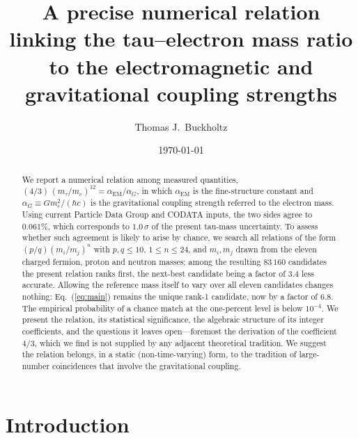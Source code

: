 \documentclass[aps,prd,twocolumn,amsmath,amssymb,floatfix,nofootinbib]{revtex4-2}
\begin{document}
\title{A precise numerical relation linking the tau--electron mass ratio
to the electromagnetic and gravitational coupling strengths}

\author{Thomas J.\ Buckholtz}

\date{\today}

\begin{abstract}
We report a numerical relation among measured quantities,
$(4/3)\,(m_\tau/m_e)^{12} = \alpha_{\mathrm{EM}}/\alpha_G$,
in which $\alpha_{\mathrm{EM}}$ is the fine-structure constant and
$\alpha_G \equiv G m_e^2/(\hbar c)$ is the gravitational coupling strength
referred to the electron mass. Using current Particle Data Group and CODATA
inputs, the two sides agree to $0.061\%$, which corresponds to
$1.0\,\sigma$ of the present tau-mass uncertainty. To assess whether such
agreement is likely to arise by chance, we search all relations of the form
$(p/q)(m_i/m_j)^n$ with $p,q\le 10$, $1\le n\le 24$, and $m_i,m_j$ drawn from
the eleven charged fermion, proton and neutron masses; among the resulting
$83\,160$ candidates the present relation ranks first, the next-best candidate
being a factor of $3.4$ less accurate. Allowing the reference mass itself to
vary over all eleven candidates changes nothing: Eq.~(\ref{eq:main}) remains
the unique rank-1 candidate, now by a factor of $6.8$. The empirical
probability of a chance match at the one-percent level is below $10^{-4}$. We
present the relation, its statistical significance, the algebraic structure of
its integer coefficients, and the questions it leaves open---foremost the
derivation of the coefficient $4/3$, which we find is not supplied by any
adjacent theoretical tradition. We suggest the relation belongs, in a static
(non-time-varying) form, to the tradition of large-number coincidences that
involve the gravitational coupling.
\end{abstract}

\maketitle

\section{Introduction}
\end{document}
